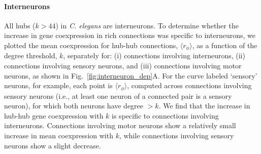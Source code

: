 \documentclass[10pt,letterpaper]{article}
\begin{document}
\paragraph{Interneurons}
All hubs ($k > 44$) in \emph{C. elegans} are interneurons. %
To determine whether the increase in gene coexpression in rich connections was specific to interneurons, we plotted the mean coexpression for hub-hub connections, $\langle r_\phi \rangle$, as a function of the degree threshold, $k$, separately for:
(i) connections involving interneurons,
(ii) connections involving sensory neurons, and
(iii) connections involving motor neurons, as shown in Fig.~\ref{fig:interneuron_dep}A.
For the curve labeled `sensory' neurons, for example, each point is $\langle r_\phi \rangle$, computed across connections involving sensory neurons (i.e., at least one neuron of a connected pair is a sensory neuron), for which both neurons have degree $>k$.
We find that the increase in hub-hub gene coexpression with $k$ is specific to connections involving interneurons.
Connections involving motor neurons show a relatively small increase in mean coexpression with $k$, while connections involving sensory neurons show a slight decrease.
\end{document}
